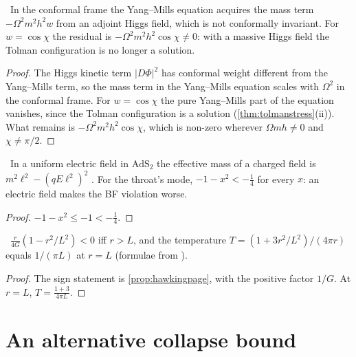 \begin{proposition}\label{prop:higgsbreak}\ver\
In the conformal frame the Yang--Mills equation acquires the mass term $-\Omega^2m^2h^2w$ from an adjoint Higgs field, which is not conformally invariant. For $w=\cos\chi$ the residual is $-\Omega^2m^2h^2\cos\chi\ne0$: with a massive Higgs field the Tolman configuration is no longer a solution.
\end{proposition}
\begin{proof}
The Higgs kinetic term $|D\Phi|^2$ has conformal weight different from the Yang--Mills term, so the mass term in the Yang--Mills equation scales with $\Omega^2$ in the conformal frame. For $w=\cos\chi$ the pure Yang--Mills part of the equation vanishes, since the Tolman configuration is a solution (\cref{thm:tolmanstress}(ii)). What remains is $-\Omega^2m^2h^2\cos\chi$, which is non-zero wherever $\Omega m h\ne0$ and $\chi\ne\pi/2$.
\end{proof}


\begin{proposition}[Dyons]\label{prop:dyonbf}\ver\
In a uniform electric field in $\mathrm{AdS}_2$ the effective mass of a charged field is $m^2\ell^2-(qE\ell^2)^2$ \ext. For the throat's mode, $-1-x^2<-\frac14$ for every $x$: an electric field makes the BF violation worse.
\end{proposition}
\begin{proof}
$-1-x^2\le-1<-\frac14$.
\end{proof}


\begin{proposition}[A Hawking--Page transition]\label{prop:hp}\ver\
$\frac r{4G}(1-r^2/L^2)<0$ iff $r>L$, and the temperature $T=(1+3r^2/L^2)/(4\pi r)$ equals $1/(\pi L)$ at $r=L$ (formulae from \cite{HawkingPage1983} \ext).
\end{proposition}
\begin{proof}
The sign statement is \cref{prop:hawkingpage}, with the positive factor $1/G$. At $r=L$, $T=\frac{1+3}{4\pi L}$.
\end{proof}


\section{An alternative collapse bound}

